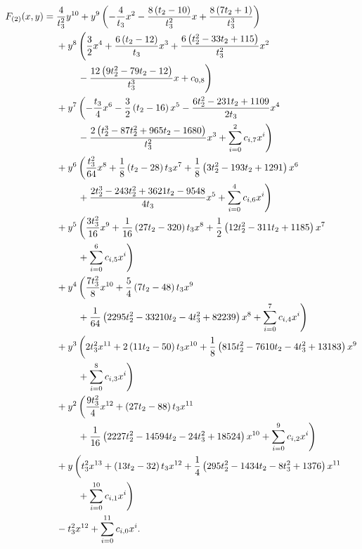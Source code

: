 \begin{align}
    \label{curve:potts_mixed_full}
    F_{(2)}(x,y)={} & \frac{4}{t_3^2}y^{10}{}+y^{9}\left(-\frac{4}{t_3}x^{2} - \frac{8 \left(t_2-10\right)}{t_3^2}x + \frac{8 \left(7 t_2+1\right)}{t_3^3}\right)\notag \\
                    & {}+y^{8}\left(\frac{3}{2}x^{4} + \frac{6 \left(t_2-12\right)}{t_3}x^{3} + \frac{6 \left(t_2^2-33 t_2+115\right)}{t_3^2}x^{2}\right.\notag \\*
                    & \qquad{}\left.{}- \frac{12 \left(9 t_2^2-79 t_2-12\right)}{t_3^3}x + c_{0,8}\right)\notag \\
                    & {}+y^{7}\left(-\frac{t_3}{4}x^{6} - \frac{3}{2} \left(t_2-16\right)x^{5} - \frac{6 t_2^2-231 t_2+1109}{2 t_3}x^{4}\right.\notag \\*
                    & \qquad{}\left.{}- \frac{2 \left(t_2^3-87 t_2^2+965 t_2-1680\right)}{t_3^2}x^{3} + \sum_{i=0}^{2}c_{i,7}x^i\right)\notag \\
                    & {}+y^{6}\left(\frac{t_3^2}{64}x^{8} + \frac{1}{8} \left(t_2-28\right) t_3x^{7} + \frac{1}{8} \left(3 t_2^2-193 t_2+1291\right)x^{6}\right.\notag \\*
                    & \qquad{}\left.{}+ \frac{2 t_2^3-243 t_2^2+3621 t_2-9548}{4 t_3}x^{5} + \sum_{i=0}^{4}c_{i,6}x^i\right)\notag \\
                    & {}+y^{5}\left(\frac{3 t_3^2}{16}x^{9} + \frac{1}{16} \left(27 t_2-320\right) t_3x^{8} + \frac{1}{2} \left(12 t_2^2-311 t_2+1185\right)x^{7}\right.\notag \\*
                    & \qquad{}\left.{}+ \sum_{i=0}^{6}c_{i,5}x^i\right)\notag \\
                    & {}+y^{4}\left(\frac{7 t_3^2}{8}x^{10} + \frac{5}{4} \left(7 t_2-48\right) t_3x^{9}\right.\notag \\*
                    & \qquad{}\left.{}+ \frac{1}{64} \left(2295 t_2^2-33210 t_2-4 t_3^2+82239\right)x^{8} + \sum_{i=0}^{7}c_{i,4}x^i\right)\notag \\
                    & {}+y^{3}\left(2 t_3^2x^{11} + 2 \left(11 t_2-50\right) t_3x^{10} + \frac{1}{8} \left(815 t_2^2-7610 t_2-4 t_3^2+13183\right)x^{9}\right.\notag \\*
                    & \qquad{}\left.{}+ \sum_{i=0}^{8}c_{i,3}x^i\right)\notag \\
                    & {}+y^{2}\left(\frac{9 t_3^2}{4}x^{12} + \left(27 t_2-88\right) t_3x^{11}\right.\notag \\*
                    & \qquad{}\left.{}+ \frac{1}{16} \left(2227 t_2^2-14594 t_2-24 t_3^2+18524\right)x^{10} + \sum_{i=0}^{9}c_{i,2}x^i\right)\notag \\
                    & {}+y\left(t_3^2x^{13} + \left(13 t_2-32\right) t_3x^{12} + \frac{1}{4} \left(295 t_2^2-1434 t_2-8 t_3^2+1376\right)x^{11}\right.\notag \\*
                    & \qquad{}\left.{}+ \sum_{i=0}^{10}c_{i,1}x^i\right)\notag \\
                    & {}-t_3^2x^{12} + \sum_{i=0}^{11}c_{i,0}x^i.
\end{align}
